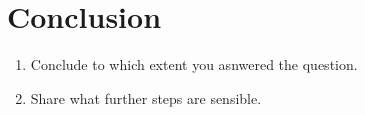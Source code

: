 \section{Conclusion}

\begin{enumerate}
    \item Conclude to which extent you asnwered the question.
    \item Share what further steps are sensible.
\end{enumerate}